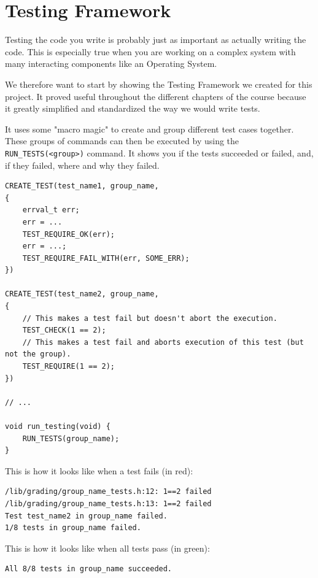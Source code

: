 \chapter{Testing Framework}

Testing the code you write is probably just as important as actually writing the code.
This is especially true when you are working on a complex system with many interacting components like an Operating System.

We therefore want to start by showing the Testing Framework we created for this project.
It proved useful throughout the different chapters of the course because it greatly simplified and standardized the way we would write tests.

It uses some "macro magic" to create and group different test cases together.
These groups of commands can then be executed by using the \texttt{RUN_TESTS(<group>)} command.
It shows you if the tests succeeded or failed, and, if they failed, where and why they failed.

\begin{verbatim}
CREATE_TEST(test_name1, group_name, 
{
    errval_t err;
    err = ...
    TEST_REQUIRE_OK(err);
    err = ...;
    TEST_REQUIRE_FAIL_WITH(err, SOME_ERR);
})

CREATE_TEST(test_name2, group_name, 
{
    // This makes a test fail but doesn't abort the execution.
    TEST_CHECK(1 == 2);
    // This makes a test fail and aborts execution of this test (but not the group).
    TEST_REQUIRE(1 == 2); 
})

// ...

void run_testing(void) {
    RUN_TESTS(group_name);
}
\end{verbatim}
This is how it looks like when a test fails (in red):
\begin{verbatim}
/lib/grading/group_name_tests.h:12: 1==2 failed
/lib/grading/group_name_tests.h:13: 1==2 failed
Test test_name2 in group_name failed.
1/8 tests in group_name failed.
\end{verbatim}
This is how it looks like when all tests pass (in green):
\begin{verbatim}
All 8/8 tests in group_name succeeded.
\end{verbatim}